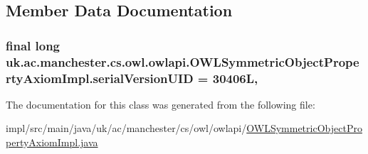 \subsection{Member Data Documentation}
\hypertarget{classuk_1_1ac_1_1manchester_1_1cs_1_1owl_1_1owlapi_1_1_o_w_l_symmetric_object_property_axiom_impl_a0056c4dd75eef21c35bd6f543c5e0b77}{
\subsubsection[{serial\-Version\-U\-I\-D}]{\setlength{\rightskip}{0pt plus 5cm}final long uk.\-ac.\-manchester.\-cs.\-owl.\-owlapi.\-O\-W\-L\-Symmetric\-Object\-Property\-Axiom\-Impl.\-serial\-Version\-U\-I\-D = 30406\-L\hspace{0.3cm}{\ttfamily [static]}, {\ttfamily [private]}}}\label{classuk_1_1ac_1_1manchester_1_1cs_1_1owl_1_1owlapi_1_1_o_w_l_symmetric_object_property_axiom_impl_a0056c4dd75eef21c35bd6f543c5e0b77}


The documentation for this class was generated from the following file\-:\begin{DoxyCompactItemize}
\item 
impl/src/main/java/uk/ac/manchester/cs/owl/owlapi/\hyperlink{_o_w_l_symmetric_object_property_axiom_impl_8java}{O\-W\-L\-Symmetric\-Object\-Property\-Axiom\-Impl.\-java}\end{DoxyCompactItemize}
